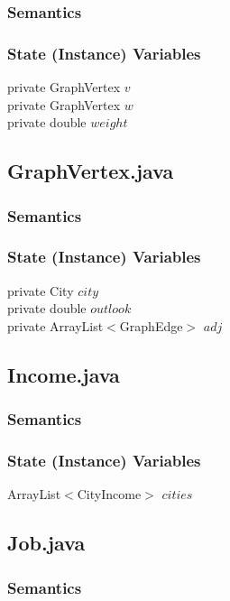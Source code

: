 \documentclass[12pt,fleqn]{article}
\begin{document}
\subsubsection*{Semantics}
\subsubsection*{State (Instance) Variables}
	private GraphVertex $v$\\
	private GraphVertex $w$\\
	private double $weight$\\


\subsection*{GraphVertex.java}\label{pvertex}

\subsubsection*{Semantics}
\subsubsection*{State (Instance) Variables}
	private City $city$\\
	private double $outlook$\\
	private ArrayList$<$GraphEdge$>$ $adj$\\


\subsection*{Income.java}\label{pincome}


\subsubsection*{Semantics}
\subsubsection*{State (Instance) Variables}
ArrayList$<$CityIncome$>$ $cities$\\


\subsection*{Job.java}\label{pjob}

\subsubsection*{Semantics}
\end{document}
